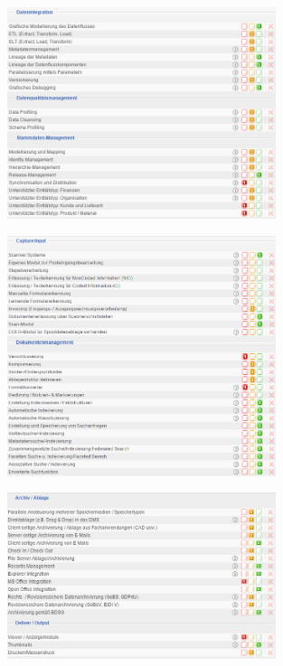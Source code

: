 \documentclass[12pt]{article}
\begin{document}
\noindent
\begin{figure}[here!]
\centering
\includegraphics[width=0.7\textwidth]{images/tr33}
\end{figure}\FloatBarrier
\noindent
\begin{figure}[here!]
\centering
\includegraphics[width=0.7\textwidth]{images/tr34}
\end{figure}\FloatBarrier
\noindent
\begin{figure}[here!]
\centering
\includegraphics[width=0.7\textwidth]{images/tr35}
\end{figure}\FloatBarrier
\end{document}

